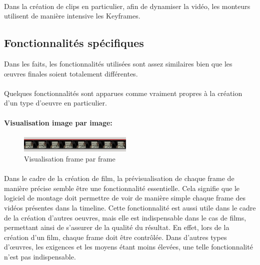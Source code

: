 \paragraph{}

Dans la création de clips en particulier, afin de dynamiser la vidéo,
les monteurs utilisent de manière intensive les Keyframes.

\subsection{Fonctionnalités spécifiques} %

Dans les faits, les fonctionnalités utilisées sont assez similaires
bien que les œuvres finales soient totalement différentes.

\paragraph{}

Quelques fonctionnalités sont apparues comme vraiment propres à la
création d'un type d'oeuvre en particulier.

\paragraph{Visualisation image par image:}

\begin{figure}

    \begin{center}

      \includegraphics[width=0.48\textwidth]{images/frameByFrame}

    \end{center} \caption{Visualisation frame par frame} \label{Yes}

\end{figure}

\paragraph{}

Dans le cadre de la création de film, la prévisualisation de
chaque frame de manière précise semble être une fonctionnalité
essentielle. Cela signifie que le logiciel de montage doit permettre
de voir de manière simple chaque frame des vidéos présentes dans
la timeline. Cette fonctionnalité est aussi utile dans le cadre de la
création d'autres oeuvres, mais elle est indispensable dans le cas de
films, permettant ainsi de s'assurer de la qualité du résultat. En
effet, lors de la création d'un film, chaque frame doit être
contrôlée. Dans d'autres types d'œuvres, les exigences et les moyens
étant moins élevées, une telle fonctionnalité n'est pas indispensable.


